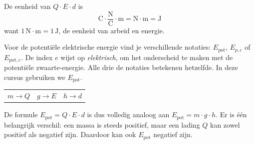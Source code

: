 \documentclass{ximera}
\begin{document}
\begin{remark}[expandable=true,title={Eenheid van de potentiële energie}]\nl
De eenheid van $Q \cdot E \cdot d$ is
\[
    \mathrm{C} \cdot \frac{\mathrm{N}}{\mathrm{C}} \cdot \mathrm{m} = \mathrm{N} \cdot \mathrm{m} = \mathrm{J}
\]
want $1 \, \mathrm{N} \cdot \mathrm{m} = 1 \, \mathrm{J}$, de eenheid van arbeid en energie.
\end{remark}

\begin{remark}[expandable=true,title={Notatie}]\nl
Voor de potentiële elektrische energie vind je verschillende notaties: $E_{\text{pot}}$, $E_{p,e}$ of $E_{\text{pot},e}$. De index $e$ wijst op \emph{elektrisch}, om het onderscheid te maken met de potentiële zwaarte-energie. Alle drie de notaties betekenen hetzelfde. In deze cursus gebruiken we $E_{\text{pot}}$.
\end{remark}

\begin{remark}[expandable=true,title={Vergelijking met het zwaarteveld}]\nl
\begin{center}
\begin{tabular}{ccc}
    $m \to Q$ & $g \to E$ & $h \to d$
\end{tabular}
\end{center}
De formule $E_{\text{pot}} = Q \cdot E \cdot d$ is dus volledig analoog aan $E_{\text{pot}} = m \cdot g \cdot h$. Er is één belangrijk verschil: een massa is steeds positief, maar een lading $Q$ kan zowel positief als negatief zijn. Daardoor kan ook $E_{\text{pot}}$ negatief zijn.
\end{remark}
\end{document}
